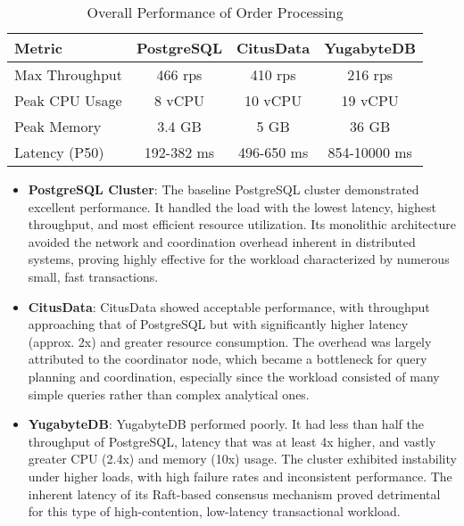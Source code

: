 \begin{table}[h]
    \caption{Overall Performance of Order Processing}
    \label{tab:perf_summary}
    \centering
    \begin{tabular}{|l|c|c|c|}
        \hline
        \textbf{Metric} & \textbf{PostgreSQL} & \textbf{CitusData} & \textbf{YugabyteDB} \\
        \hline
        Max Throughput  & 466 rps             & 410 rps            & 216 rps             \\
        \hline
        Peak CPU Usage  & 8 vCPU              & 10 vCPU            & 19 vCPU             \\
        \hline
        Peak Memory     & 3.4 GB              & 5 GB               & 36 GB               \\
        \hline
        Latency (P50)   & 192-382 ms          & 496-650 ms         & 854-10000 ms        \\
        \hline
    \end{tabular}
\end{table}

\begin{itemize}
    \item \textbf{PostgreSQL Cluster}: The baseline PostgreSQL cluster demonstrated excellent performance. It handled the load with the lowest latency, highest throughput, and most efficient resource utilization. Its monolithic architecture avoided the network and coordination overhead inherent in distributed systems, proving highly effective for the workload characterized by numerous small, fast transactions.

    \item \textbf{CitusData}: CitusData showed acceptable performance, with throughput approaching that of PostgreSQL but with significantly higher latency (approx. 2x) and greater resource consumption. The overhead was largely attributed to the coordinator node, which became a bottleneck for query planning and coordination, especially since the workload consisted of many simple queries rather than complex analytical ones.

    \item \textbf{YugabyteDB}: YugabyteDB performed poorly. It had less than half the throughput of PostgreSQL, latency that was at least 4x higher, and vastly greater CPU (2.4x) and memory (10x) usage. The cluster exhibited instability under higher loads, with high failure rates and inconsistent performance. The inherent latency of its Raft-based consensus mechanism proved detrimental for this type of high-contention, low-latency transactional workload.

\end{itemize}

